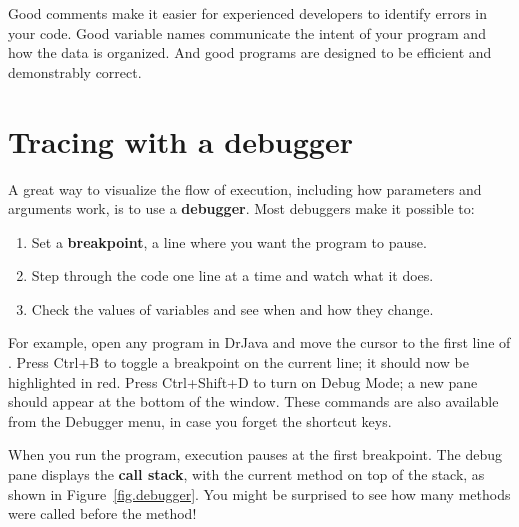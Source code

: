 Good comments make it easier for experienced developers to identify errors in your code.
Good variable names communicate the intent of your program and how the data is organized.
And good programs are designed to be efficient and demonstrably correct.


\section{Tracing with a debugger}
\label{debugger}


A great way to visualize the flow of execution, including how parameters and arguments work, is to use a {\bf debugger}.
Most debuggers make it possible to:


\begin{enumerate}
\item Set a {\bf breakpoint}, a line where you want the program to pause.
\item Step through the code one line at a time and watch what it does.
\item Check the values of variables and see when and how they change.
\end{enumerate}

For example, open any program in DrJava and move the cursor to the first line of .
Press {\sf Ctrl+B} to toggle a breakpoint on the current line; it should now be highlighted in red.
Press {\sf Ctrl+Shift+D} to turn on Debug Mode; a new pane should appear at the bottom of the window.
These commands are also available from the {\sf Debugger} menu, in case you forget the shortcut keys.


When you run the program, execution pauses at the first breakpoint.
The debug pane displays the {\bf call stack}, with the current method on top of the stack, as shown in Figure~\ref{fig.debugger}.
You might be surprised to see how many methods were called before the  method!

